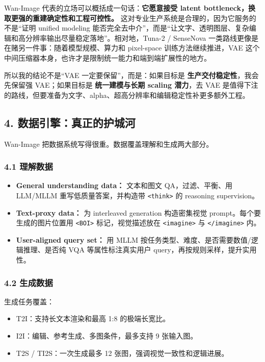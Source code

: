 Wan-Image 代表的立场可以概括成一句话：\textbf{它愿意接受 latent bottleneck，换取更强的重建确定性和工程可控性。} 这对专业生产系统是合理的，因为它服务的不是“证明 unified modeling 能否完全去中介”，而是“让文字、透明图层、复杂编辑和高分辨率输出尽量稳定落地”。相对地，Tuna-2 / SenseNova 一类路线更像是在赌另一件事：随着模型规模、算力和 pixel-space 训练方法继续推进，VAE 这个中间压缩器本身，也许才是限制统一能力和端到端扩展性的地方。

\begin{intubox}
所以我的结论不是“VAE 一定要保留”，而是：如果目标是 \textbf{生产交付稳定性}，我会先保留强 VAE；如果目标是 \textbf{统一建模与长期 scaling 潜力}，去 VAE 是值得下注的路线，但要准备为文字、alpha、超高分辨率和编辑稳定性补更多额外工程。
\end{intubox}

\subsection{4. 数据引擎：真正的护城河}

Wan-Image 把数据系统写得很重。数据覆盖理解和生成两大部分。

\subsubsection{4.1 理解数据}

\begin{itemize}[leftmargin=1.5em]
  \item \textbf{General understanding data：} 文本和图文 QA，过滤、平衡、用 LLM/MLLM 重写低质量答案，并构造带 \texttt{<think>} 的 reasoning supervision。
  \item \textbf{Text-proxy data：} 为 interleaved generation 构造密集视觉 prompt。每个要生成的图片位置用 \texttt{<BOI>} 标记，视觉描述放在 \texttt{<imagine>} 与 \texttt{</imagine>} 内。
  \item \textbf{User-aligned query set：} 用 MLLM 按任务类型、难度、是否需要数值/逻辑推理、是否纯 VQA 等属性标注真实用户 query，再按规则采样，提升实用性。
\end{itemize}

\subsubsection{4.2 生成数据}

生成任务覆盖：

\begin{itemize}[leftmargin=1.5em]
  \item T2I：支持长文本渲染和最高 1:8 的极端长宽比。
  \item I2I：编辑、参考生成、多图条件，最多支持 9 张输入图。
  \item T2S / TI2S：一次生成最多 12 张图，强调视觉一致性和逻辑进展。
\end{itemize}

